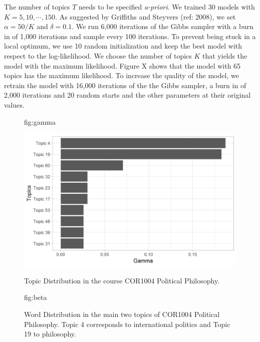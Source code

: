 \documentclass[pmlr]{jmlr}%
\begin{document}
The number of topics $T$ needs to be specified \textit{a-priori}. We trained 30 models with $K=5,10,\cdots,150$. As suggested by Griffiths and Steyvers (ref: 2008), we set $\alpha=50/K$ and $\delta=0.1$. We run 6,000 iterations of the Gibbs sampler with a burn in of 1,000 iterations and sample every 100 iterations. To prevent being stuck in a local optimum, we use 10 random initialization and keep the best model with respect to the log-likelihood. We choose the number of topics $K$ that yields the model with the maximum likelihood. Figure X shows that the model with 65 topics has the maximum likelihood. To increase the quality of the model, we retrain the model with 16,000 iterations of the the Gibbs sampler, a burn in of 2,000 iterations and 20 random starts and the other parameters at their original values.


\begin{figure}[htbp]
	\floatconts
	{fig:gamma}
	{\caption{Topic Distribution in the course COR1004 Political Philosophy.}}
	{\includegraphics[width=0.5\linewidth]{figures/gamma-COR1004}}
\end{figure}

\begin{figure}[htbp]
	\floatconts
	{fig:beta}
	{\caption{Word Distribution in the main two topics of COR1004 Political Philosophy. Topic 4 corresponds to international politics and Topic 19 to philosophy.}}
	{
		\qquad
	}
\end{figure}
\end{document}
